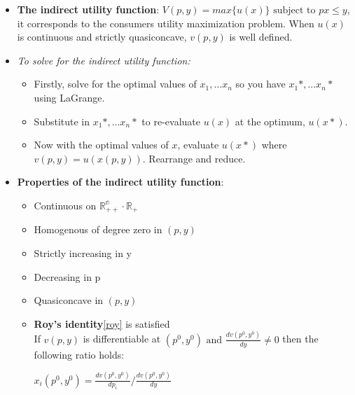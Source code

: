 \documentclass{article}
\begin{document}
\begin{itemize}
    \item \textbf{The indirect utility function}: $V(p,y) = max\{u(x)\} \text{ subject to } px \leq y$, it corresponds to the consumers utility maximization problem. When $u(x)$ is continuous and strictly quasiconcave, $v(p,y)$ is well defined.
    \item \textit{To solve for the indirect utility function: }
    \begin{itemize}
        \item Firstly, solve for the optimal values of $x_1,...x_n$ so you have $x_1*,...x_n*$ using LaGrange. 
        \item Substitute in $x_1*,...x_n*$ to re-evaluate $u(x)$ at the optimum, $u(x*)$. 
        \item Now with the optimal values of $x$, evaluate $u(x*)$ where $v(p,y) = u(x(p,y))$. Rearrange and reduce. 
    \end{itemize}
    \item \textbf{Properties of the indirect utility function}:
        \begin{itemize}
            \item Continuous on $\mathbb{R^{n}_{++}}\cdot\mathbb{R_{+}}$
            \item Homogenous of degree zero in $(p,y)$
            \item Strictly increasing in y
            \item Decreasing in p
            \item Quasiconcave in $(p,y)$
            \item \textbf{Roy's identity}\ref{roy} is satisfied \\
            If $v(p,y)$ is differentiable at $(p^0,y^0) \text{ and } \frac{dv(p^0,y^0)}{dy} \neq 0$ then the following ratio holds: \\ 
            \begin{center}
                $x_i(p^0,y^0) = \frac{dv(p^0,y^0)}{dp_{i}} \Big/ \frac{dv(p^0,y^0)}{dy}$
            \end{center}
        \end{itemize}
    


\end{itemize}
\end{document}
